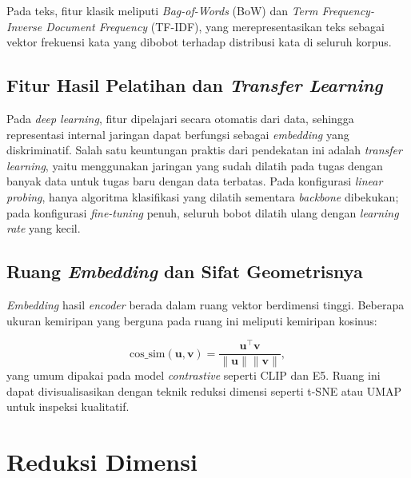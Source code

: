 Pada teks, fitur klasik meliputi \textit{Bag-of-Words} (BoW) dan \textit{Term Frequency-Inverse Document Frequency} (TF-IDF), yang merepresentasikan teks sebagai vektor frekuensi kata yang dibobot terhadap distribusi kata di seluruh korpus.

\subsection{Fitur Hasil Pelatihan dan \textit{Transfer Learning}}

Pada \textit{deep learning}, fitur dipelajari secara otomatis dari data, sehingga representasi internal jaringan dapat berfungsi sebagai \textit{embedding} yang diskriminatif. Salah satu keuntungan praktis dari pendekatan ini adalah \textit{transfer learning}, yaitu menggunakan jaringan yang sudah dilatih pada tugas dengan banyak data untuk tugas baru dengan data terbatas. Pada konfigurasi \textit{linear probing}, hanya algoritma klasifikasi yang dilatih sementara \textit{backbone} dibekukan; pada konfigurasi \textit{fine-tuning} penuh, seluruh bobot dilatih ulang dengan \textit{learning rate} yang kecil.

\subsection{Ruang \textit{Embedding} dan Sifat Geometrisnya}

\textit{Embedding} hasil \textit{encoder} berada dalam ruang vektor berdimensi tinggi. Beberapa ukuran kemiripan yang berguna pada ruang ini meliputi kemiripan kosinus:

\begin{equation}
    \text{cos\_sim}(\mathbf{u}, \mathbf{v}) = \frac{\mathbf{u}^\top \mathbf{v}}{\|\mathbf{u}\| \|\mathbf{v}\|},
    \label{eq:cosine}
\end{equation}
yang umum dipakai pada model \textit{contrastive} seperti CLIP dan E5. Ruang ini dapat divisualisasikan dengan teknik reduksi dimensi seperti t-SNE atau UMAP untuk inspeksi kualitatif.
\section{Reduksi Dimensi}
\label{sec:pca}

